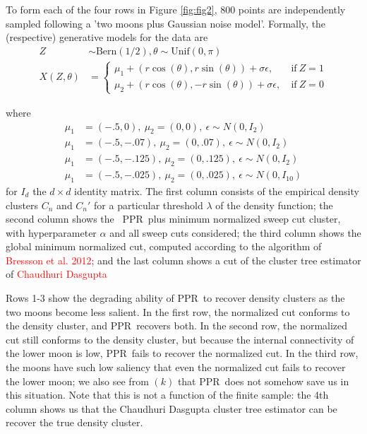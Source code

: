 \documentclass{article}
\newcommand{\1}{\mathbf{1}}
\newcommand{\pprspace}{{\sc PPR~}}
\theoremstyle{aldenthm}
\theoremstyle{aldenrmrk}
\begin{document}
To form each of the four rows in Figure \ref{fig:fig2}, 800 points are independently sampled following a 'two moons plus Gaussian noise model'. Formally, the (respective) generative models for the data are
\begin{align}
Z & \sim \textrm{Bern}(1/2), \theta \sim \textrm{Unif}(0, \pi) \\
X(Z,\theta) & = 
\begin{cases}
\mu_1 + (r \cos(\theta), r \sin(\theta)) + \sigma \epsilon,~ & \text{if}~ Z = 1 \\
\mu_2 + (r \cos(\theta), - r \sin(\theta)) + \sigma \epsilon,~ & \text{if}~ Z = 0
\end{cases}
\end{align}

where 
\begin{align*}
\mu_1 & = (-.5, 0),~ \mu_2 = (0,0),~ \epsilon \sim N(0, I_2) \tag{row 1} \\
\mu_1 & = (-.5, -.07),~ \mu_2 = (0,.07),~ \epsilon \sim N(0, I_2) \tag{row 2} \\
\mu_1 & = (-.5, -.125),~ \mu_2 = (0,.125),~ \epsilon \sim N(0, I_2) \tag{row 3} \\
\mu_1 & = (-.5, -.025),~ \mu_2 = (0,.025),~ \epsilon \sim N(0, I_{10}) \tag{row 4}
\end{align*}
for $I_d$ the $d \times d$ identity matrix. The first column consists of the empirical density clusters $C_n$ and $C_n'$ for a particular threshold $\lambda$ of the density function; the second column shows the ~\pprspace plus minimum normalized sweep cut cluster, with hyperparameter $\alpha$ and all sweep cuts considered; the third column shows the global minimum normalized cut, computed according to the algorithm of \textcolor{red}{Bressson et al. 2012}; and the last column shows a cut of the cluster tree estimator of \textcolor{red}{Chaudhuri Dasgupta}

Rows 1-3 show the degrading ability of \pprspace to recover density clusters as the two moons become less salient. In the first row, the normalized cut conforms to the density cluster, and \pprspace recovers both. In the second row, the normalized cut still conforms to the density cluster, but because the internal connectivity of the lower moon is low, \pprspace fails to recover the normalized cut. In the third row, the moons have such low saliency that even the normalized cut fails to recover the lower moon; we also see from $(k)$ that \pprspace does not somehow save us in this situation. Note that this is not a function of the finite sample: the 4th column shows us that the Chaudhuri Dasgupta cluster tree estimator can be recover the true density cluster.
\end{document}
